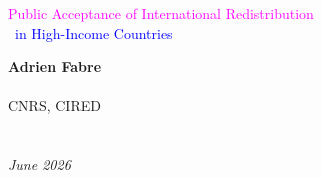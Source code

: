 \documentclass[aspectratio=169,xcolor=dvipsnames, 11pt,mathserif]{beamer}
\begin{document}



\begin{frame}
\thispagestyle{empty}
\begin{center}
\begin{LARGE}
\textcolor{magenta}{Public Acceptance of International Redistribution}\\~\textcolor{blue}{in High-Income Countries} \end{LARGE}
\vspace{1cm}

\textbf{Adrien Fabre} \\ \quad \\
CNRS, CIRED \\ \quad \\ \quad \\
\textit{June 2026} 
\end{center}
\bigskip
\end{frame}

\end{document}
